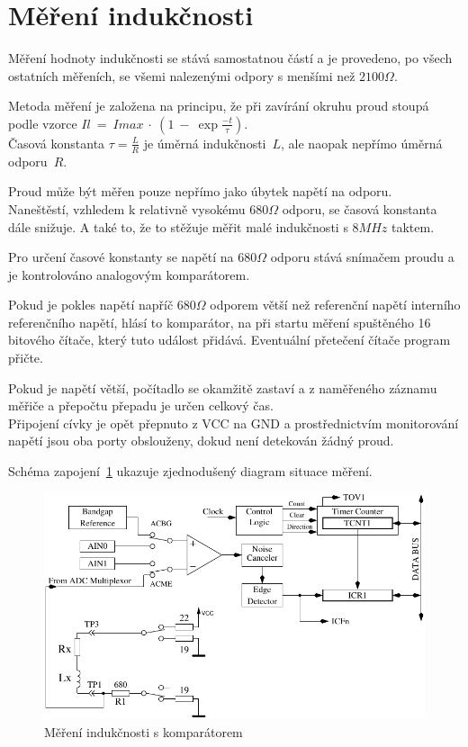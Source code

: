 \section{Měření indukčnosti}
Měření hodnoty indukčnosti se stává samostatnou částí a je provedeno, po všech ostatních měřeních, se všemi
nalezenými odpory s menšími než \(2100\Omega\).

Metoda měření je založena na principu, že při zavírání okruhu proud stoupá\\ podle vzorce \(Il~=~Imax~\cdot~(1~-~\exp{\frac{-t}{\tau}})\).\\
Časová konstanta \(\tau = \frac{L}{R}\) je úměrná indukčnosti~\(L\), ale naopak nepřímo
úměrná odporu~\(R\).
 
Proud může být měřen pouze nepřímo jako úbytek napětí na odporu.\\
Naneštěstí, vzhledem k relativně vysokému \(680\Omega\) odporu, se časová konstanta dále snižuje. A také to, že to stěžuje měřit malé indukčnosti s \(8MHz\) taktem.

Pro určení časové konstanty se napětí na \(680\Omega\) odporu stává snímačem proudu a je kontrolováno
analogovým komparátorem.

Pokud je pokles napětí napříč \(680\Omega\) odporem větší než referenční napětí interního referenčního napětí, hlásí to komparátor, na při startu měření spuštěného 16 bitového čítače, který tuto událost přidává. Eventuální přetečení čítače program přičte.

Pokud je napětí větší, počítadlo se okamžitě zastaví a z naměřeného záznamu měřiče a přepočtu přepadu je určen celkový čas.\\
Připojení cívky je opět přepnuto z VCC na GND a prostřednictvím monitorování napětí jsou oba porty obslouženy, dokud není detekován žádný proud.

Schéma zapojení~\ref{fig:Inductance} ukazuje zjednodušený diagram situace měření.

\begin{figure}[H]
\centering
\includegraphics[]{../FIG/Inductance.pdf}
\caption{Měření indukčnosti s komparátorem}
\label{fig:Inductance}
\end{figure}

